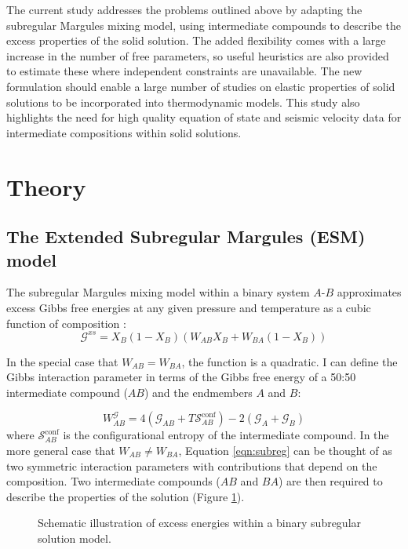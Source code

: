 The current study addresses the problems outlined above by adapting the subregular Margules mixing model, using intermediate compounds to describe the excess properties of the solid solution. The added flexibility comes with a large increase in the number of free parameters, so useful heuristics are also provided to estimate these where independent constraints are unavailable. The new formulation should enable a large number of studies on elastic properties of solid solutions to be incorporated into thermodynamic models. This study also highlights the need for high quality equation of state and seismic velocity data for intermediate compositions within solid solutions.

\section{Theory} 
\subsection{The Extended Subregular Margules (ESM) model}
The subregular Margules mixing model within a binary system $A$-$B$ approximates excess Gibbs free energies at any given pressure and temperature as a cubic function of composition \citep{HW1989}:
\begin{equation}
  \mathcal{G}^{xs} = X_B (1-X_B) \left(W_{AB} X_B + W_{BA} (1-X_B) \right)
  \label{eqn:subreg}
\end{equation}

In the special case that $W_{AB} = W_{BA}$, the function is a quadratic. I can define the Gibbs interaction parameter in terms of the Gibbs free energy of a 50:50 intermediate compound ($AB$) and the endmembers $A$ and $B$:

\begin{equation}
  W^{\mathcal{G}}_{AB} = 4(\mathcal{G}_{AB} + T\mathcal{S}^{\textrm{conf}}_{AB}) - 2(\mathcal{G}_A + \mathcal{G}_B)
\end{equation}
\noindent where $\mathcal{S}^{\textrm{conf}}_{AB}$ is the configurational entropy of the intermediate compound. In the more general case that $W_{AB} \neq W_{BA}$, Equation \ref{eqn:subreg} can be thought of as two symmetric interaction parameters with contributions that depend on the composition. Two intermediate compounds ($AB$ and $BA$) are then required to describe the properties of the solution (Figure \ref{fig:schematic}).

\begin{figure}[ht!]
  \centering
  \caption{Schematic illustration of excess energies within a binary subregular solution model.}
  \label{fig:schematic}
\end{figure}


